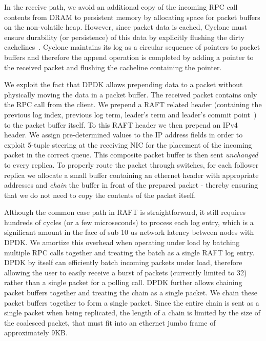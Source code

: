 \documentclass[letterpaper,twocolumn,10pt]{article}
\begin{document}
In the receive path, we avoid an additional copy of the incoming RPC call
contents from DRAM to persistent memory by allocating space for packet buffers
on the non-volatile heap. However, since packet data is cached, Cyclone must
ensure durability (or persistence) of this data by explicitly flushing the dirty
cachelines~\cite{pmfs}. Cyclone maintains its log as a circular sequence of
pointers to packet buffers and therefore the append operation is completed by
adding a pointer to the received packet and flushing the cacheline containing
the pointer.

We exploit the fact that DPDK allows prepending data to a packet
without physically moving the data in a packet buffer. The received packet
contains only the RPC call from the client. We prepend a RAFT related header
(containing the previous log index, previous log term, leader's term and
leader's commit point~\cite{raft}) to the packet buffer itself. To this RAFT header 
we then prepend an IPv4 header. We assign pre-determined values to the
IP address fields in order to exploit 5-tuple steering at the receiving NIC for 
the placement of the incoming packet in the correct queue.
This composite packet buffer is then sent \emph{unchanged} to every replica.
To properly route the packet through switches, for each follower replica we
allocate a small buffer containing an ethernet header with appropriate addresses
and \emph{chain} the buffer in front of the prepared packet - thereby ensuring
that we do not need to copy the contents of the packet itself.

Although the common case path in RAFT is straightforward, it still requires
hundreds of cycles (or a few microseconds) to process each log entry, which is a
significant amount in the face of sub 10 us network latency between nodes with
DPDK. We amortize this overhead when operating under load by batching multiple
RPC calls together and treating the batch as a single RAFT log entry.  DPDK by
itself can efficiently batch incoming packets under load, therefore allowing the
user to easily receive a burst of packets (currently limited to 32) rather than
a single packet for a polling call.  DPDK further allows chaining packet buffers
together and treating the chain as a single packet. We chain these packet
buffers together to form a single packet. Since the entire chain is sent as a
single packet when being replicated, the length of a chain is limited by the
size of the coalesced packet, that must fit into an ethernet jumbo frame of
approximately 9KB.
\end{document}
